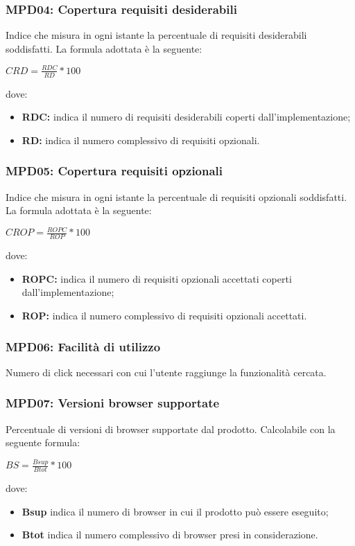 \subsubsection{MPD04: Copertura requisiti desiderabili}
Indice che misura in ogni istante la percentuale di requisiti desiderabili soddisfatti.
La formula adottata è la seguente:
\begin{center}
    $CRD = \displaystyle \frac{RDC}{RD}*100$
\end{center}
dove:
\begin{itemize}
    \item \textbf{RDC:} indica il numero di requisiti desiderabili coperti dall'implementazione;
    \item \textbf{RD:} indica il numero complessivo di requisiti opzionali.
\end{itemize}

\subsubsection{MPD05: Copertura requisiti opzionali}
Indice che misura in ogni istante la percentuale di requisiti opzionali soddisfatti.
La formula adottata è la seguente:
\begin{center}
    $CROP = \displaystyle \frac{ROPC}{ROP}*100$
\end{center}
dove:
\begin{itemize}
    \item \textbf{ROPC:} indica il numero di requisiti opzionali accettati coperti dall'implementazione;
    \item \textbf{ROP:} indica il numero complessivo di requisiti opzionali accettati.
\end{itemize}

\subsubsection{MPD06: Facilità di utilizzo}
Numero di click necessari con cui l'utente raggiunge la funzionalità cercata.

\subsubsection{MPD07: Versioni browser supportate}
Percentuale di versioni di browser supportate dal prodotto.
Calcolabile con la seguente formula:
\begin{center}
    $BS = \displaystyle \frac{Bsup}{Btot}*100$
\end{center}
dove:
\begin{itemize}
    \item \textbf{Bsup} indica il numero di browser in cui il prodotto può essere eseguito;
    \item \textbf{Btot} indica il numero complessivo di browser presi in considerazione.
\end{itemize}